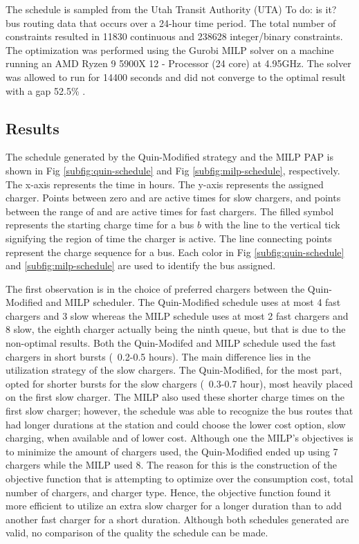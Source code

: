 \documentclass[utf8]{FrontiersinHarvard}
\let\cite\citep                                                                 %
\newcommand{\TODO}[1]{{\color{green} To do: #1}}                                %
\newcommand{\fast}{15 }                                                         %
\newcommand{\slow}{15 }                                                         %
\newcommand{\timeran}{14400 }                                                   %
\newcommand{\gappercent}{52.5\% }                                               %
\begin{document}
The schedule is sampled from the Utah Transit Authority (UTA) \TODO{is it?} bus routing data that occurs over a 24-hour
time period. The total number of constraints resulted in 11830 continuous and 238628 integer/binary constraints. The
optimization was performed using the Gurobi MILP solver \cite{GurobiOptimization2021} on a machine running an AMD Ryzen
9 5900X 12 - Processor (24 core) at 4.95GHz. The solver was allowed to run for \timeran seconds and did not converge to
the optimal result with a gap \gappercent.

\subsection{Results}

The schedule generated by the Quin-Modified strategy and the MILP PAP is shown in Fig \ref{subfig:quin-schedule} and Fig
\ref{subfig:milp-schedule}, respectively. The x-axis represents the time in hours. The y-axis represents the assigned
charger. Points between zero and \fpeval{\slow - 1} are active times for slow chargers, and points between the range of
\fpeval{\slow - 1} and \fpeval{\fast + \slow - 1} are active times for fast chargers. The filled symbol represents the
starting charge time for a bus $b$ with the line to the vertical tick signifying the region of time the charger is
active. The line connecting points represent the charge sequence for a bus. Each color in Fig \ref{subfig:quin-schedule}
and \ref{subfig:milp-schedule} are used to identify the bus assigned.

The first observation is in the choice of preferred chargers between the Quin-Modified and MILP scheduler. The
Quin-Modified schedule uses at most 4 fast chargers and 3 slow whereas the MILP schedule uses at most 2 fast chargers
and 8 slow, the eighth charger actually being the ninth queue, but that is due to the non-optimal results. Both the
Quin-Modifed and MILP schedule used the fast chargers in short bursts (~0.2-0.5 hours). The main difference lies in the
utilization strategy of the slow chargers. The Quin-Modified, for the most part, opted for shorter bursts for the slow
chargers (~0.3-0.7 hour), most heavily placed on the first slow charger. The MILP also used these shorter charge times
on the first slow charger; however, the schedule was able to recognize the bus routes that had longer durations at the
station and could choose the lower cost option, slow charging, when available and of lower cost. Although one the MILP's
objectives is to minimize the amount of chargers used, the Quin-Modified ended up using 7 chargers while the MILP used
8. The reason for this is the construction of the objective function that is attempting to optimize over the consumption
cost, total number of chargers, and charger type. Hence, the objective function found it more efficient to utilize an
extra slow charger for a longer duration than to add another fast charger for a short duration. Although both schedules
generated are valid, no comparison of the quality the schedule can be made.
\end{document}
